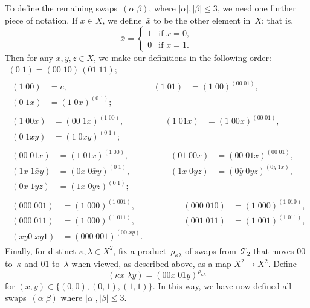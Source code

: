 \documentclass[a4paper,11pt]{article}
\numberwithin{equation}{section}
\newcommand{\length}[1]{\mathopen{|}#1\mathclose{|}}
\newcommand{\swap}[2]{(#1\;#2)}
\newcommand{\Sw}[1]{\mathcal{T}_{#1}}
\renewcommand{\leq}{\leqslant}
\begin{document}
To define the remaining swaps~$\swap{\alpha}{\beta}$, where
$\length{\alpha},\length{\beta} \leq 3$, we need one further piece of
notation.  If $x \in X$, we define~$\bar{x}$ to be the other element
in~$X$; that is,
\[
\bar{x} = \begin{cases}
  1 &\text{if $x = 0$}, \\
  0 &\text{if $x = 1$}.
\end{cases}
\]
Then for any $x,y,z \in X$, we make our definitions in the following
order:
\begin{gather}
  \swap{0}{1} = \swap{00}{10} \, \swap{01}{11};
  \label{D:11} \\[10pt]
  \begin{aligned}
    \swap{1}{00} &= c,
    &\swap{1}{01} &= \swap{1}{00}^{\swap{00}{01}}, \\
    \swap{0}{1x} &= \swap{1}{0x}^{\swap{0}{1}}; \qquad\qquad
  \end{aligned} \label{D:12} \\[10pt]
  \begin{aligned}
    \swap{1}{00x} &= \swap{00}{1x}^{\swap{1}{00}}, \qquad\qquad
    &\swap{1}{01x} &= \swap{1}{00x}^{\swap{00}{01}}, \\
    \swap{0}{1xy} &= \swap{1}{0xy}^{\swap{0}{1}};
  \end{aligned} \label{D:13} \\[10pt]
  \begin{aligned}
    \swap{00}{01x} &= \swap{1}{01x}^{\swap{1}{00}},
    &\swap{01}{00x} &= \swap{00}{01x}^{\swap{00}{01}}, \\
    \swap{1x}{1\bar{x}y} &= \swap{0x}{0\bar{x}y}^{\swap{0}{1}},
    &\swap{1x}{0yz} &= \swap{0\bar{y}}{0yz}^{\swap{0\bar{y}}{1x}}, \\
    \swap{0x}{1yz} &= \swap{1x}{0yz}^{\swap{0}{1}}; \qquad\qquad
  \end{aligned} \label{D:23} \\[10pt]
  \begin{aligned}
    \swap{000}{001} &= \swap{1}{000}^{\swap{1}{001}},
    &\swap{000}{010} &= \swap{1}{000}^{\swap{1}{010}}, \\
    \swap{000}{011} &= \swap{1}{000}^{\swap{1}{011}},
    &\swap{001}{011} &= \swap{1}{001}^{\swap{1}{011}}, \\
    \swap{xy0}{xy1} &= \swap{000}{001}^{\swap{00}{xy}}. \qquad\qquad
  \end{aligned} \label{D:33}
\end{gather}
Finally, for distinct $\kappa,\lambda \in X^{2}$, fix a
product~$\rho_{\kappa\lambda}$ of swaps from~$\Sw{2}$ that moves $00$
to~$\kappa$ and $01$ to~$\lambda$ when viewed, as described above, as
a map $X^{2} \to X^{2}$.  Define
\begin{equation}
  \swap{\kappa x}{\lambda y} = \swap{00x}{01y}^{\rho_{\kappa\lambda}}
  \label{D:other33}
\end{equation}
for $(x,y) \in \{ (0,0), (0,1), (1,1) \}$.  In this way, we have now
defined all swaps~$\swap{\alpha}{\beta}$ where $\length{\alpha},
\length{\beta} \leq 3$.
\end{document}
